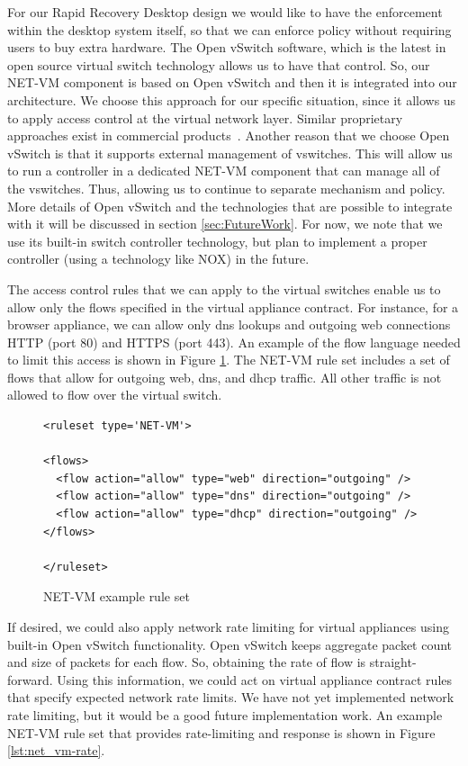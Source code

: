 For our Rapid Recovery Desktop design we would like to have the enforcement within the desktop system itself, so that we can enforce policy without requiring users to buy extra hardware. The Open vSwitch software, which is the latest in open source virtual switch technology allows us to have that control. So, our NET-VM component is based on Open vSwitch and then it is integrated into our architecture. We choose this approach for our specific situation, since it allows us to apply access control at the virtual network layer. Similar proprietary approaches exist in commercial products~\cite{vmware_vNetwork_Distributed_Switch_website, cisco_nexus_website}. Another reason that we choose Open vSwitch is that it supports external management of vswitches. This will allow us to run a controller in a dedicated NET-VM component that can manage all of the vswitches. Thus, allowing us to continue to separate mechanism and policy. More details of Open vSwitch and the technologies that are possible to integrate with it will be discussed in section \ref{sec:FutureWork}. For now, we note that we use its built-in switch controller technology, but plan to implement a proper controller (using a technology like NOX\cite{nox_website}) in the future.

The access control rules that we can apply to the virtual switches enable us to allow only the flows specified in the virtual appliance contract. For instance, for a browser appliance, we can allow only dns lookups and outgoing web connections HTTP (port 80) and HTTPS (port 443). An example of the flow language needed to limit this access is shown in Figure \ref{lst:net_vm}. The NET-VM rule set includes a set of flows that allow for outgoing web, dns, and dhcp traffic. All other traffic is not allowed to flow over the virtual switch.

\begin{figure}[tbp]
\caption{NET-VM example rule set}
\label{lst:net_vm}

\begin{lstlisting}
<ruleset type='NET-VM'>

<flows>
  <flow action="allow" type="web" direction="outgoing" />
  <flow action="allow" type="dns" direction="outgoing" />
  <flow action="allow" type="dhcp" direction="outgoing" />
</flows>

</ruleset>
\end{lstlisting}
\end{figure}

If desired, we could also apply network rate limiting for virtual appliances using built-in Open vSwitch functionality. Open vSwitch keeps aggregate packet count and size of packets for each flow. So, obtaining the rate of flow is straight-forward. Using this information, we could act on virtual appliance contract rules that specify expected network rate limits. We have not yet implemented network rate limiting, but it would be a good future implementation work.  An example NET-VM rule set that provides rate-limiting and response is shown in Figure \ref{lst:net_vm-rate}.

